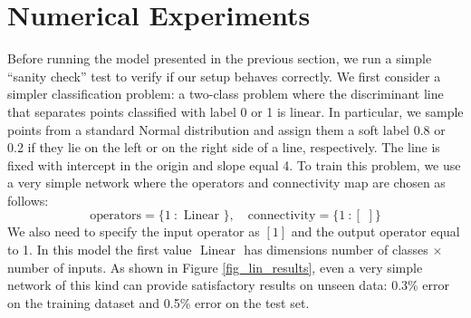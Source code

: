 \documentclass{article}
\begin{document}
\section{Numerical Experiments}\label{sec_numexp}
Before running the model presented in the previous section, we run a simple ``sanity check'' test to verify if our setup behaves correctly.
We first consider a simpler classification problem: a two-class  problem where the discriminant line that separates  points classified with label 0 or 1 is  linear. 
In particular, we sample  points from a standard Normal distribution and assign them a soft label 0.8 or 0.2 if they lie on the left or on the right side of a  line, respectively.
The line is fixed with intercept in the origin and slope equal 4. 
To train this problem, we use a very simple network where the operators and connectivity map are chosen as follows:
\begin{equation*}
\text{operators} =  \{  1  \: :  \text{ Linear } \},
 \quad 
\text{connectivity} =  \{  1  \: : [\,\, ]  \}
\end{equation*}
We also need to specify the input operator as $[1]$ and the output operator equal to 1. 
In this model the first value $ \text{ Linear }$ has dimensions number of classes $\times$ number of inputs.
As shown in Figure \ref{fig_lin_results}, even a very simple network of this kind can provide satisfactory results on unseen data: 0.3\% error on the training dataset and 0.5\% error on the test set. 
\end{document}
